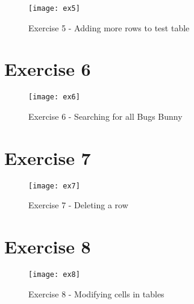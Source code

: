 \begin{figure}[H]
  \caption{Exercise 5 - Adding more rows to test table}
  \centering
  \texttt{[image: ex5]}
\end{figure}

\section{Exercise 6}

\begin{figure}[H]
  \caption{Exercise 6 - Searching for all Bugs Bunny}
  \centering
  \texttt{[image: ex6]}
\end{figure}

\section{Exercise 7}

\begin{figure}[H]
  \caption{Exercise 7 - Deleting a row}
  \centering
  \texttt{[image: ex7]}
\end{figure}

\section{Exercise 8}

\begin{figure}[H]
  \caption{Exercise 8 - Modifying cells in tables}
  \centering
  \texttt{[image: ex8]}
\end{figure}
